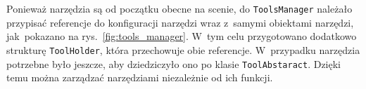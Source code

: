 
\newpage %

Ponieważ narzędzia są od początku obecne na scenie, 
do \texttt{ToolsManager} należało przypisać referencje do konfiguracji narzędzi wraz z~samymi obiektami narzędzi,
jak~pokazano na rys.~\ref{fig:tools_manager}.
W~tym celu przygotowano dodatkowo strukturę \texttt{ToolHolder},
która przechowuje obie referencje.
W~przypadku narzędzia potrzebne było jeszcze,
aby dziedziczyło ono po klasie \texttt{ToolAbstaract}.
Dzięki temu można zarządzać narzędziami niezależnie od ich funkcji.

